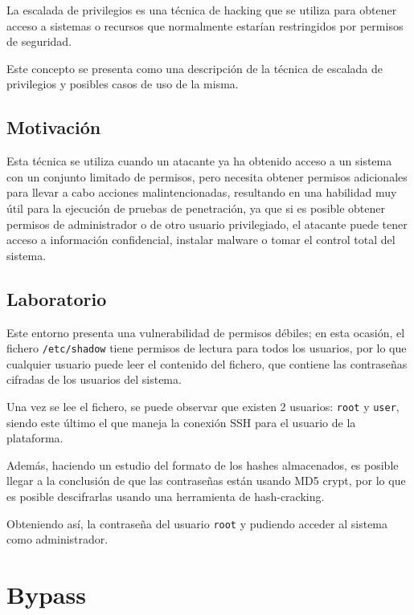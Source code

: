         La escalada de privilegios es una técnica de hacking que se utiliza para obtener acceso a sistemas o recursos que normalmente estarían restringidos por permisos de seguridad. 

        Este concepto se presenta como una descripción de la técnica de escalada de privilegios y posibles casos de uso de la misma.

        \subsection{Motivación}

            Esta técnica se utiliza cuando un atacante ya ha obtenido acceso a un sistema con un conjunto limitado de permisos, pero necesita obtener permisos adicionales para llevar a cabo acciones malintencionadas, resultando en una habilidad muy útil para la ejecución de pruebas de penetración, ya que si es posible obtener permisos de administrador o de otro usuario privilegiado, el atacante puede tener acceso a información confidencial, instalar malware o tomar el control total del sistema.

        \subsection{Laboratorio}

            Este entorno presenta una vulnerabilidad de permisos débiles; en esta ocasión, el fichero \texttt{/etc/shadow} tiene permisos de lectura para todos los usuarios, por lo que cualquier usuario puede leer el contenido del fichero, que contiene las contraseñas cifradas de los usuarios del sistema.

            Una vez se lee el fichero, se puede observar que existen 2 usuarios: \texttt{root} y \texttt{user}, siendo este último el que maneja la conexión SSH para el usuario de la plataforma.

            Además, haciendo un estudio del formato de los hashes almacenados, es posible llegar a la conclusión de que las contraseñas están usando MD5 crypt, por lo que es posible descifrarlas usando una herramienta de hash-cracking.

            Obteniendo así, la contraseña del usuario \texttt{root} y pudiendo acceder al sistema como administrador.


    \section{Bypass}

